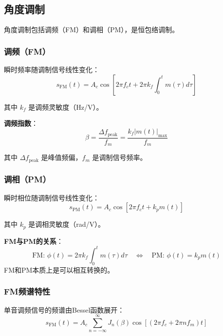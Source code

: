 \subsection{角度调制}
\label{sec:angle_modulation}

角度调制包括调频（FM）和调相（PM），是恒包络调制。

\subsubsection{调频（FM）}

瞬时频率随调制信号线性变化：
\begin{equation}
    s_{\text{FM}}(t) = A_c \cos\left[2\pi f_c t + 2\pi k_f \int_0^t m(\tau) d\tau\right]
\end{equation}

其中 $k_f$ 是调频灵敏度（Hz/V）。

\textbf{调频指数}：
\begin{equation}
    \beta = \frac{\Delta f_{\text{peak}}}{f_m} = \frac{k_f |m(t)|_{\text{max}}}{f_m}
\end{equation}

其中 $\Delta f_{\text{peak}}$ 是峰值频偏，$f_m$ 是调制信号频率。

\subsubsection{调相（PM）}

瞬时相位随调制信号线性变化：
\begin{equation}
    s_{\text{PM}}(t) = A_c \cos\left[2\pi f_c t + k_p m(t)\right]
\end{equation}

其中 $k_p$ 是调相灵敏度（rad/V）。

\textbf{FM与PM的关系}：
\begin{equation}
    \text{FM: } \phi(t) = 2\pi k_f \int_0^t m(\tau) d\tau \quad \Leftrightarrow \quad \text{PM: } \phi(t) = k_p m(t)
\end{equation}
FM和PM本质上是可以相互转换的。

\subsubsection{FM频谱特性}

单音调频信号的频谱由Bessel函数展开：
\begin{equation}
    s_{\text{FM}}(t) = A_c \sum_{n=-\infty}^{\infty} J_n(\beta) \cos[(2\pi f_c + 2\pi n f_m)t]
\end{equation}

